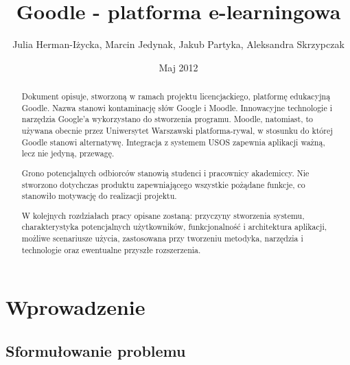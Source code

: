 \documentclass{pracamgr}
\author{Julia Herman-Iżycka, Marcin Jedynak, Jakub Partyka, Aleksandra Skrzypczak}
\title{Goodle - platforma e-learningowa}
\date{Maj 2012}
\begin{document}
\maketitle

%
%
\begin{abstract}
Dokument opisuje, stworzoną w ramach projektu licencjackiego, platformę 
edukacyjną Goodle. Nazwa stanowi kontaminację słów Google i Moodle. 
Innowacyjne technologie i narzędzia Google'a wykorzystano do stworzenia
programu. Moodle, natomiast, to używana obecnie przez Uniwersytet Warszawski
platforma-rywal, w stosunku do której Goodle stanowi alternatywę. Integracja z
systemem USOS zapewnia aplikacji ważną, lecz nie jedyną, przewagę. 

Grono potencjalnych odbiorców stanowią studenci i pracownicy akademiccy. Nie 
stworzono dotychczas produktu zapewniającego wszystkie pożądane funkcje, co 
stanowiło motywację do realizacji projektu. 

W kolejnych rozdziałach pracy opisane zostaną: przyczyny stworzenia systemu,
charakterystyka potencjalnych użytkowników, funkcjonalność i architektura 
aplikacji, możliwe scenariusze użycia, zastosowana przy tworzeniu metodyka,
narzędzia i technologie oraz ewentualne przyszłe rozszerzenia.
\end{abstract}

\tableofcontents

\chapter*{Wprowadzenie} %

%
%
\section{Sformułowanie problemu}

%
%
\end{document}
